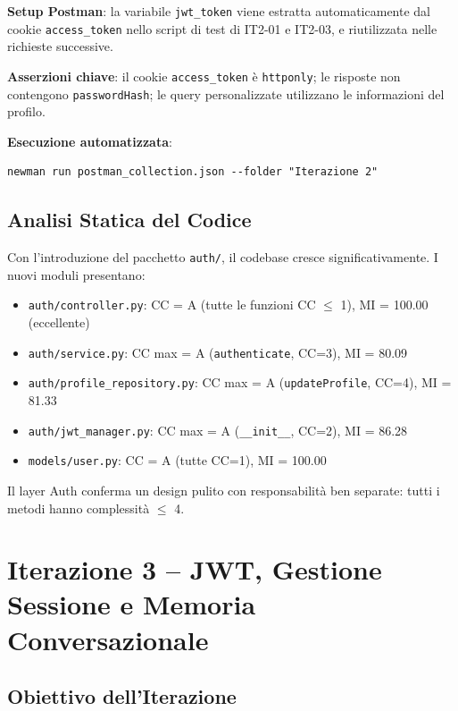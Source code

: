 \documentclass[a4paper,12pt]{report}
\begin{document}
\textbf{Setup Postman}: la variabile \texttt{jwt\_token} viene estratta automaticamente dal cookie \texttt{access\_token} nello script di test di IT2-01 e IT2-03, e riutilizzata nelle richieste successive.

\textbf{Asserzioni chiave}: il cookie \texttt{access\_token} è \texttt{httponly}; le risposte non contengono \texttt{passwordHash}; le query personalizzate utilizzano le informazioni del profilo.

\textbf{Esecuzione automatizzata}:
\begin{verbatim}
newman run postman_collection.json --folder "Iterazione 2"
\end{verbatim}

\section{Analisi Statica del Codice}

Con l'introduzione del pacchetto \texttt{auth/}, il codebase cresce significativamente. I nuovi moduli presentano:
\begin{itemize}
    \item \texttt{auth/controller.py}: CC = A (tutte le funzioni CC $\leq$ 1), MI = 100.00 (eccellente)
    \item \texttt{auth/service.py}: CC max = A (\texttt{authenticate}, CC=3), MI = 80.09
    \item \texttt{auth/profile\_repository.py}: CC max = A (\texttt{updateProfile}, CC=4), MI = 81.33
    \item \texttt{auth/jwt\_manager.py}: CC max = A (\texttt{\_\_init\_\_}, CC=2), MI = 86.28
    \item \texttt{models/user.py}: CC = A (tutte CC=1), MI = 100.00
\end{itemize}

Il layer Auth conferma un design pulito con responsabilità ben separate: tutti i metodi hanno complessità $\leq$ 4.


\chapter{Iterazione 3 -- JWT, Gestione Sessione e Memoria Conversazionale}

\section{Obiettivo dell'Iterazione}
\end{document}
